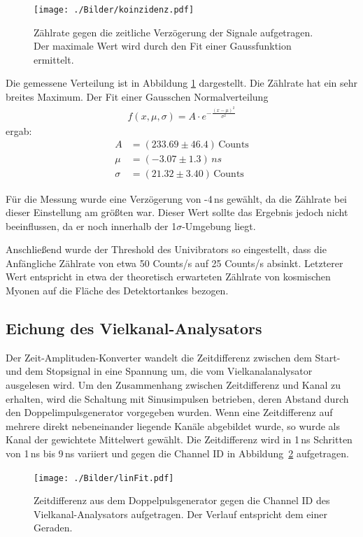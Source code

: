 \begin{figure}[htbp]
	\texttt{[image: ./Bilder/koinzidenz.pdf]}
	\caption{Zählrate gegen die zeitliche Verzögerung der Signale aufgetragen. Der maximale Wert wird durch den Fit einer Gaussfunktion ermittelt.}
	\label{fig:koinzidenz}
\end{figure}

Die gemessene Verteilung ist in Abbildung \ref{fig:koinzidenz} dargestellt. Die Zählrate hat ein sehr breites Maximum. Der Fit einer Gausschen Normalverteilung
\begin{align}
	f(x,\mu,\sigma) = A\cdot e^{-\frac{(x-\mu)^2}{\sigma^2}}
\end{align}
ergab:
\begin{align}
A &= (233.69 \pm 46.4)\,\text{Counts}\\
\mu &= (-3.07 \pm 1.3)\,\si{ns}\\
\sigma &= ({21.32} \pm 3.40)\,\si{\text{Counts}}
\end{align}

Für die Messung wurde eine Verzögerung von -4\,\si{ns} gewählt, da die Zählrate bei dieser Einstellung am größten war. Dieser Wert sollte das Ergebnis jedoch nicht beeinflussen, da er noch innerhalb der 1$\sigma$-Umgebung liegt.

Anschließend wurde der Threshold des Univibrators so eingestellt, dass die Anfängliche Zählrate von etwa 50 Counts/s auf 25 Counts/s absinkt. Letzterer Wert entspricht in etwa der theoretisch erwarteten Zählrate von kosmischen Myonen auf die Fläche des Detektortankes bezogen.

\subsection{Eichung des Vielkanal-Analysators}
Der Zeit-Amplituden-Konverter wandelt die Zeitdifferenz zwischen dem Start- und dem Stopsignal in eine Spannung um, die vom Vielkanalanalysator ausgelesen wird. Um den Zusammenhang zwischen Zeitdifferenz und Kanal zu erhalten, wird die Schaltung mit Sinusimpulsen betrieben, deren Abstand durch den Doppelimpulsgenerator vorgegeben wurden. Wenn eine Zeitdifferenz auf mehrere direkt nebeneinander liegende Kanäle abgebildet wurde, so wurde als Kanal der gewichtete Mittelwert gewählt. Die Zeitdifferenz wird in 1\,\si{ns} Schritten von 1\,ns bis 9\,ns variiert und gegen die Channel ID in \mbox{Abbildung \ref{fig:linFit}} aufgetragen.

\begin{figure}[H]
	\texttt{[image: ./Bilder/linFit.pdf]}
	\caption{Zeitdifferenz aus dem Doppelpulsgenerator gegen die Channel ID des Vielkanal-Analysators aufgetragen. Der Verlauf entspricht dem einer Geraden.}
	\label{fig:linFit}
\end{figure}


